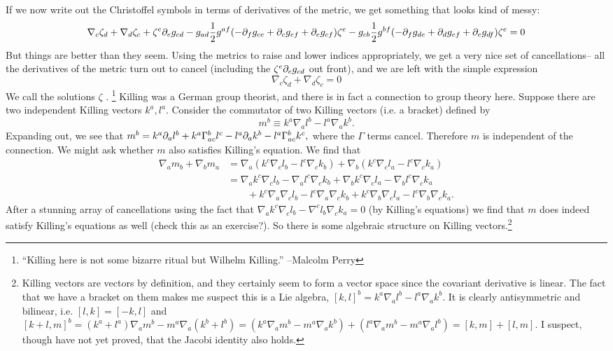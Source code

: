 If we now write out the Christoffel symbols in terms of derivatives of the metric, we get something that looks kind of messy:
$$\nabla_c \zeta_d +\nabla_d \zeta_c +\zeta^e \partial_e g_{cd} -g_{ad} \frac{1}{2} g^{af}(-\partial_f g_{ce}+\partial_c g_{ef} +\partial_e g_{cf})\zeta^e - g_{cb}\frac{1}{2} g^{bf}(-\partial_f g_{de}+\partial_d g_{ef}+\partial_e g_{df})\zeta^e=0$$
But things are better than they seem. Using the metrics to raise and lower indices appropriately, we get a very nice set of cancellations-- all the derivatives of the metric turn out to cancel (including the $\zeta^e \partial_e g_{cd}$ out front), and we are left with the simple expression
$$\nabla_c \zeta_d +\nabla_d \zeta_c=0$$
We call the solutions $\zeta$ .%
    \footnote{``Killing here is not some bizarre ritual but Wilhelm Killing.'' --Malcolm Perry}
Killing was a German group theorist, and there is in fact a connection to group theory here. Suppose there are two independent Killing vectors $k^a,l^a$. Consider the commutator of two Killing vectors (i.e. a bracket) defined by
$$m^b\equiv k^a\nabla_a l^b - l^a \nabla_a k^b.$$
Expanding out, we see that
$m^b=k^a\partial_a l^b+ k^a\Gamma^b_{ac} l^c - l^a \partial_a k^b - l^a \Gamma^b_{ac} k^c,$
where the $\Gamma$ terms cancel. Therefore $m$ is independent of the connection. We might ask whether $m$ also satisfies Killing's equation. We find that
\begin{align*}
\nabla_a m_b +\nabla_b m_a &= \nabla_a (k^c \nabla_c l_b - l^c \nabla_c k_b)+\nabla_b (k^c \nabla_c l_a -l^c \nabla_c k_a)\\
&= \nabla_a k^c \nabla_c l_b -\nabla_a l^c \nabla_c k_b + \nabla_b k^c \nabla_c l_a -\nabla_b l^c \nabla_c k_a\\
&{}\qquad+k^c \nabla_a \nabla_c l_b - l^c \nabla_a \nabla_c k_b +k^c \nabla_b \nabla_c l_a - l^c \nabla_b \nabla_c k_a.
\end{align*}
After a stunning array of cancellations using the fact that $\nabla_a k^c \nabla_c l_b - \nabla^c l_b \nabla_c k_a=0$ (by Killing's equations) we find that $m$ does indeed satisfy Killing's equations as well (check this as an exercise?). So there is some algebraic structure on Killing vectors.\footnote{Killing vectors are vectors by definition, and they certainly seem to form a vector space since the covariant derivative is linear. The fact that we have a bracket on them makes me suspect this is a Lie algebra, $[k,l]^b=k^a\nabla_a l^b - l^a \nabla_a k^b$. It is clearly antisymmetric and bilinear, i.e. $[l,k]=[-k,l]$ and $[k+l,m]^b=(k^a+l^a)\nabla_a m^b -m^a \nabla_a (k^b+l^b)=(k^a \nabla_a m^b - m^a \nabla_a k^b)+(l^a \nabla_a m^b - m^a \nabla_a l^b)=[k,m]+[l,m]$. I suspect, though have not yet proved, that the Jacobi identity also holds.}

